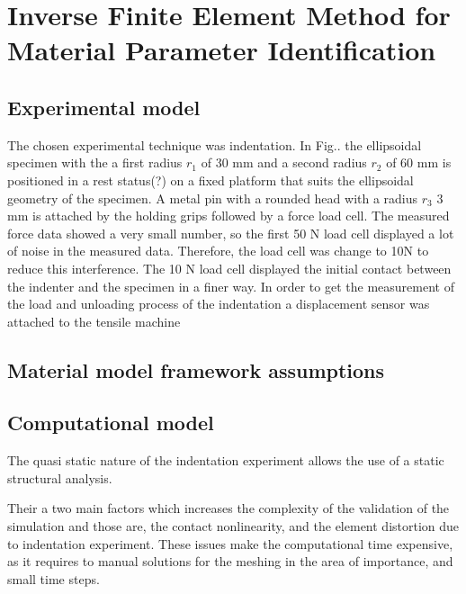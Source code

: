 
\chapter{Inverse Finite Element Method for Material Parameter Identification} %

\label{Chapter3} %

\section{Experimental model}

The chosen experimental technique was indentation. In Fig.. the ellipsoidal specimen
with the a first radius \(r_1\) of 30 mm and a second radius \(r_2\) of 60 mm is positioned
 in a rest status(?) on a fixed platform that suits the ellipsoidal geometry of the 
 specimen. A metal pin with a rounded head with a radius \(r_3\) 3 mm is attached 
 by the holding grips followed by a force load cell. 
 The measured force data showed a very small number, so the 
 first 50 N load cell displayed a lot of noise in the measured data. 
 Therefore, the load cell was change to 10N to reduce this interference. 
The 10 N load cell displayed the initial contact between the indenter and the specimen
 in a finer way. In order to get the measurement of the load and unloading process of
 the indentation a displacement sensor was attached to the tensile machine

\section{Material model framework assumptions}


\section{Computational model}
The quasi static nature of the indentation experiment allows the use of a static 
structural analysis.

Their a two main factors which increases the complexity of the validation of the simulation
and those are, the contact nonlinearity, and the element distortion due to indentation
 experiment. These issues make the computational time expensive, as it requires to manual 
 solutions for the meshing in the area of importance, and small time steps.

